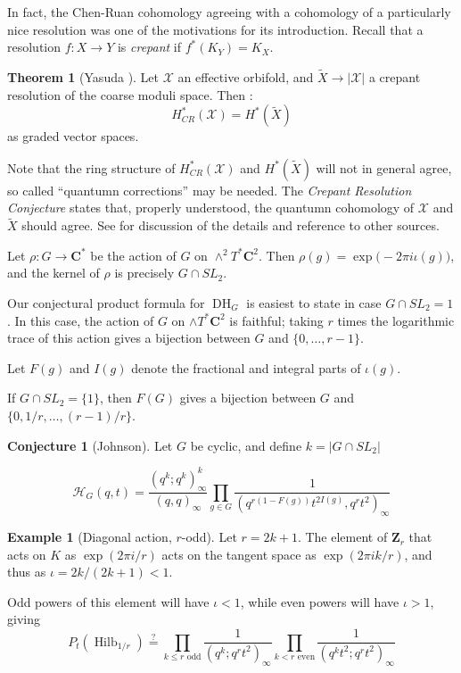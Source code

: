 \documentclass{amsart}[12pt]
\theoremstyle{definition}
\newtheorem{theorem}[dummy]{Theorem}
\newtheorem{example}[dummy]{Example}
\newtheorem{conjecture}[dummy]{Conjecture}
\newcommand{\Z}{\mathbf{Z}}
\newcommand{\C}{\mathbf{C}}
\DeclareMathOperator{\Hilb}{Hilb}
\DeclareMathOperator{\DC}{DH}
\begin{document}
In fact, the Chen-Ruan cohomology agreeing with a cohomology of a particularly nice resolution was one of the motivations for its introduction.  Recall that a resolution $f:X\to Y$ is \emph{crepant} if $f^*(K_Y)=K_X$.  

\begin{theorem}[Yasuda \cite{yasuda}] \label{thm:yasuda}
Let $\mathcal{X}$ an effective orbifold, and $\widetilde{X}\to|\mathcal{X}|$ a crepant resolution of the coarse moduli space.  Then :
$$H_{CR}^*(\mathcal{X})=H^*(\widetilde{X})$$
as graded vector spaces.  
\end{theorem}

Note that the ring structure of $H_{CR}^*(\mathcal{X})$ and $H^*(\widetilde{X})$ will not in general agree, so called ``quantumn corrections'' may be needed.  The \emph{Crepant Resolution Conjecture} states that, properly understood, the quantumn cohomology of $\mathcal{X}$ and $\widetilde{X}$ should agree.  See \cite{CoatesRuan} for discussion of the details and reference to other sources.

Let $\rho:G\to\C^*$ be the action of $G$ on $\wedge^2T^*\C^2$.  Then $\rho(g)=\exp\big(-2\pi i \iota(g)\big)$, and the kernel of $\rho$ is precisely $G\cap SL_2$.




Our conjectural product formula for $\DC_G$ is easiest to state in case $G\cap SL_2=1$.  In this case, the action of $G$ on $\wedge T^*\C^2$ is faithful; taking $r$ times the logarithmic trace of this action gives a bijection between $G$ and $\{0,\dots, r-1\}$.


Let $F(g)$ and $I(g)$ denote the fractional and integral parts of $\iota(g)$. 

If $G\cap SL_2=\{1\}$, then $F(G)$ gives a bijection between $G$ and $\{0, 1/r,\dots, (r-1)/r\}$.
\begin{conjecture}[Johnson] \label{conj:CR}
Let $G$ be cyclic, and define $k=|G\cap SL_2|$

$$\mathcal{H}_G(q,t)= \frac{(q^k;q^k)^k_\infty}{(q,q)_\infty} \prod_{g\in G}\frac{1}{(q^{r(1-F(g))} t^{2I(g)},q^rt^2)_\infty}$$

\end{conjecture}


\begin{example}[Diagonal action, $r$-odd] \label{ex:diagonalconjecture}
Let $r=2k+1$.   The element of $\Z_r$ that acts on $K$ as $\exp(2\pi i/r)$ acts on the tangent space as $\exp(2\pi i k/r)$, and thus as $\iota=2k/(2k+1)<1$.  

Odd powers of this element will have $\iota<1$, while even powers will have $\iota>1$, giving
$$P_t(\Hilb_{1/r})\stackrel{?}{=} \prod_{k\leq r \text{ odd}} \frac{1}{(q^k; q^rt^2)_\infty} \prod_{k<r \text{ even}} \frac{1}{(q^kt^2; q^rt^2)_\infty}$$

\end{example}
\end{document}
